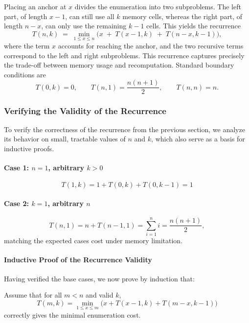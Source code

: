 \documentclass[a4paper,10pt]{article}
\begin{document}
Placing an anchor at $x$ divides the enumeration into two subproblems. The left part, of length $x-1$, can still use all $k$ memory cells, whereas the right part, of length $n-x$, can only use the remaining $k-1$ cells. This yields the recurrence
\begin{equation}\label{eq:recurrence1}
    T(n,k) \;=\; \min_{1 \le x \le n} \bigl( x \;+\; T(x-1,k) \;+\; T(n-x,k-1) \bigr),
\end{equation}
where the term $x$ accounts for reaching the anchor, and the two recursive terms correspond to the left and right subproblems. This recurrence captures precisely the trade-off between memory usage and recomputation. Standard boundary conditions are
\[
T(0,k)=0,\qquad T(n,1)=\frac{n(n+1)}{2},\qquad T(n,n)=n.
\]

                    

            \subsubsection*{Verifying the Validity of the Recurrence}
To verify the correctness of the recurrence from the previous section, we analyze its behavior on small, tractable values of \(n\) and \(k\), which also serve as a basis for inductive proofs.

\paragraph*{Case 1: \(n = 1\), arbitrary \(k > 0\)}  
\[
T(1, k) = 1 + T(0, k) + T(0, k - 1) = 1
\]

\paragraph*{Case 2: \(k = 1\), arbitrary \(n\)}  
\[
T(n, 1) = n + T(n - 1, 1) = \sum_{i=1}^{n} i = \frac{n(n + 1)}{2},
\]
matching the expected cases cost under memory limitation.

\paragraph*{Inductive Proof of the Recurrence Validity}

Having verified the base cases, we now prove by induction that:

Assume that for all \(m < n\) and valid \(k\),
\[
T(m, k) = \min_{1 \le x \le m} \bigl( x + T(x-1, k) + T(m-x, k-1) \bigr)
\]
correctly gives the minimal enumeration cost.
\end{document}
